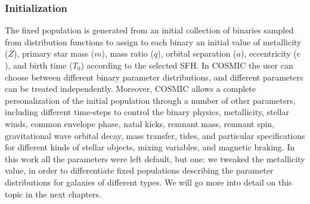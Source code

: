 \subsubsection{Initialization}
The fixed population is generated from an initial collection of binaries sampled from distribution functions to assign to each binary an initial value of metallicity ($Z$), primary star mass ($m$), mass ratio ($q$), orbital separation ($a$), eccentricity ($e$), and birth time ($T_0$) according to the selected SFH.
In COSMIC the user can choose between different binary parameter distributions, and different parameters can be treated independently.
Moreover, COSMIC allows a complete personalization of the initial population through a number of other parameters, including different time-steps to control the binary physics, metallicity, stellar winds, common envelope phase, natal kicks, remnant mass, remnant spin, gravitational wave orbital decay, mass transfer, tides, and particular specifications for different kinds of stellar objects, mixing variables, and magnetic braking.
In this work all the parameters were left default, but one: we tweaked the metallicity value, in order to differentiate fixed populations describing the parameter distributions for galaxies of different types.
We will go more into detail on this topic in the next chapters.

